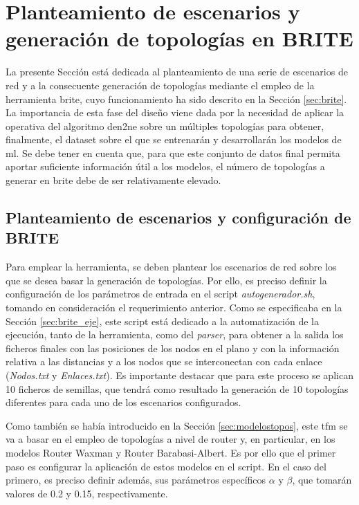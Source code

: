 \section{Planteamiento de escenarios y generación de topologías en BRITE}
\label{sec:ejebrite}

La presente Sección está dedicada al planteamiento de una serie de escenarios de red y a la consecuente generación de topologías mediante el empleo de la herramienta \gls{brite}, cuyo funcionamiento ha sido descrito en la Sección \ref{sec:brite}. La importancia de esta fase del diseño viene dada por la necesidad de aplicar la operativa del algoritmo \gls{den2ne} sobre un múltiples topologías para obtener, finalmente, el dataset sobre el que se entrenarán y desarrollarán los modelos de \gls{ml}. Se debe tener en cuenta que, para que este conjunto de datos final permita aportar suficiente información útil a los modelos, el número de topologías a generar en \gls{brite} debe de ser relativamente elevado.

\vspace{3mm}

\subsection{Planteamiento de escenarios y configuración de BRITE}
\label{sec:conftopo}

Para emplear la herramienta, se deben plantear los escenarios de red sobre los que se desea basar la generación de topologías. Por ello, es preciso definir la configuración de los parámetros de entrada en el script \textit{autogenerador.sh}, tomando en consideración el requerimiento anterior. Como se especificaba en la Sección \ref{sec:brite_eje}, este script está dedicado a la automatización de la ejecución, tanto de la herramienta, como del \textit{parser}, para obtener a la salida los ficheros finales con las posiciones de los nodos en el plano y con la información relativa a las distancias y a los nodos que se interconectan con cada enlace (\textit{Nodos.txt} y \textit{Enlaces.txt}). Es importante destacar que para este proceso se aplican 10 ficheros de semillas, que tendrá como resultado la generación de 10 topologías diferentes para cada uno de los escenarios configurados.

\vspace{3mm}

Como también se había introducido en la Sección \ref{sec:modelostopos}, este \gls{tfm} se va a basar en el empleo de topologías a nivel de router y, en particular, en los modelos Router Waxman y Router Barabasi-Albert. Es por ello que el primer paso es configurar la aplicación de estos modelos en el script. En el caso del primero, es preciso definir además, sus parámetros específicos $\alpha$ y $\beta$, que tomarán valores de 0.2 y 0.15, respectivamente.


